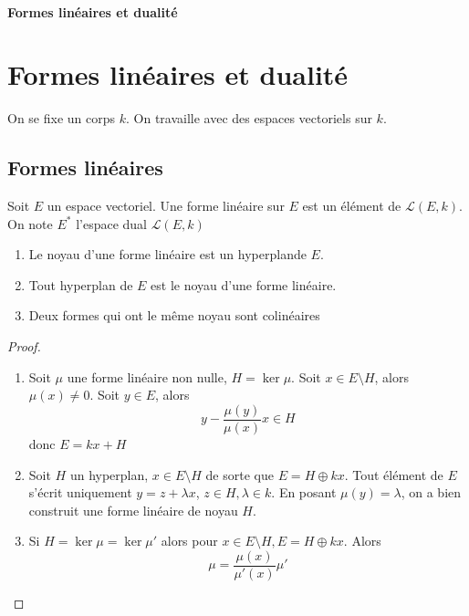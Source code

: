 \ifsolo
    ~

    \vspace{1cm}

    \begin{center}
        \textbf{\LARGE Formes linéaires et dualité} \\[1em]
    \end{center}
    \tableofcontents
\else
    \chapter{Formes linéaires et dualité}

    \minitoc
\fi
\thispagestyle{empty}

On se fixe un corps $k$. On travaille avec des espaces vectoriels sur  $k$.

\section{Formes linéaires}

 \begin{dfn}
     Soit $E$ un espace vectoriel. Une forme linéaire sur $E$ est un élément de $ \mathcal  L(E, k)$. On note $E^*$ l'espace dual $ \mathcal  L(E, k)$
\end{dfn}

\begin{prop}
    \begin{enumerate}
        \item Le noyau d'une forme linéaire est un hyperplan\footnotemark de $E$.
        \item Tout hyperplan de $E$ est le noyau d'une forme linéaire.
        \item Deux formes qui ont le même noyau sont colinéaires
    \end{enumerate}
\end{prop}


\begin{proof}
\begin{enumerate}
    \item Soit $\mu$ une forme linéaire non nulle,  $H=\ker \mu$. Soit  $x \in  E \setminus H$, alors $\mu(x)\neq 0$. Soit $y \in  E$, alors \[
            y- \frac{\mu(y)}{\mu(x)}x \in  H
    \] 
    donc $E=kx+H$
    \item Soit  $H$ un hyperplan,  $x \in  E \setminus  H$ de sorte que $E=H\oplus kx$. Tout élément de  $E$ s'écrit uniquement  $y=z+\lambda x$,  $z \in  H, \lambda \in  k$. En posant $\mu(y)=\lambda$, on a bien construit une forme linéaire de noyau  $H$. 
    \item Si $H=\ker \mu=\ker \mu'$ alors pour  $x \in  E \setminus  H, E=H\oplus kx$. Alors \[
            \mu = \frac{\mu(x)}{\mu'(x)}\mu'
    \]
\end{enumerate}
\end{proof}

